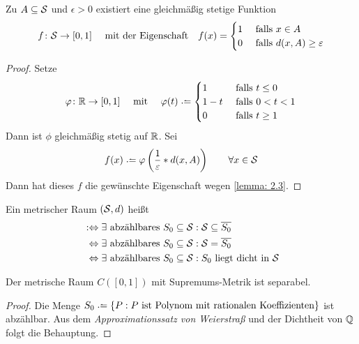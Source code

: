 \begin{satz} \label{satz: 2.4}
	Zu $A \subseteq \S$ und $\epsilon > 0$ existiert eine gleichmäßig stetige Funktion
	\begin{equation*}
		f \colon \S \to [0,1] \quad \text{ mit der Eigenschaft} \quad f(x) =
		\begin{cases}
			1 & \falls x \in A \\
			0 & \falls d(x,A) \ge \epsilon
		\end{cases}
	\end{equation*}
\end{satz}
\begin{proof}
	Setze
	\begin{equation*}
		\phi \colon \R \to [0,1] 
		\quad \mit \quad 
		\phi(t) \defeq
		\begin{cases}
			1    & \falls t \le 0 \\
			1-t  & \falls 0 < t < 1 \\
			0    & \falls t \ge 1
		\end{cases}
	\end{equation*}
	Dann ist $\phi$ gleichmäßig stetig auf $\R$. Sei
	\begin{equation*}
		f(x) \defeq \phi \brackets{\frac{1}{\epsilon} *  d(x,A)} \qquad \forall x \in \S
	\end{equation*}
	Dann hat dieses $f$ die gewünschte Eigenschaft wegen \cref{lemma: 2.3}.
\end{proof}
%
\begin{definition}\label{def: 2.5}
	Ein metrischer Raum $(\S,d)$ heißt 
	\begin{align*}
		&:\Leftrightarrow \exists \text{ abzählbares } S_0 \subseteq \S :\S \subseteq \abschluss{S_0} \\
		&\phantom{:} \Leftrightarrow \exists \text{ abzählbares } S_0 \subseteq \S : \S = \abschluss{S_0} \\
		&\phantom{:}\Leftrightarrow \exists \text{ abzählbares } S_0 \subseteq \S : S_0 \text{ liegt dicht in } \S
	\end{align*}
\end{definition}

\begin{beispiel} \label{bsp: 2.6}
	Der metrische Raum $C([0,1])$ mit Supremums-Metrik ist separabel.
\end{beispiel}
\begin{proof}
	Die Menge $S_0 \defeq \menge{P : P \text{ ist Polynom mit rationalen Koeffizienten}}$ ist abzählbar. Aus dem \textit{Approximationssatz von Weierstraß} und der Dichtheit von $\Q$ folgt die Behauptung.
\end{proof}

